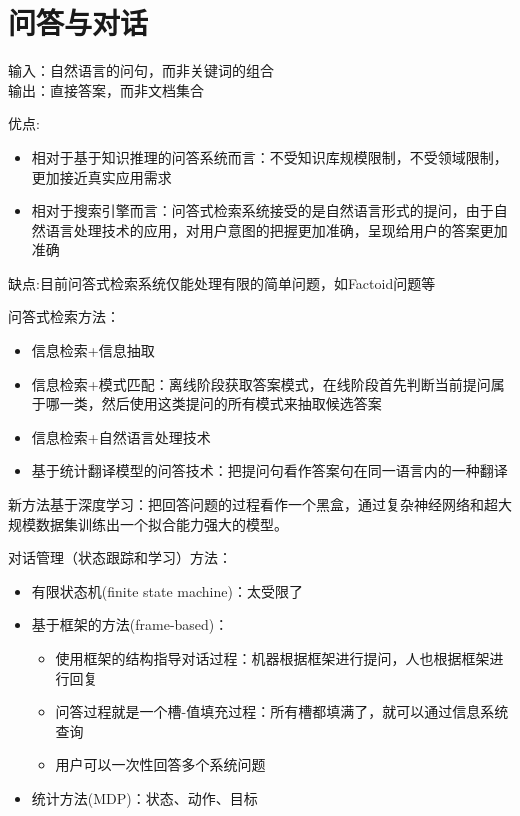 
\section{问答与对话}
\begin{definition}[问答系统]
输入：自然语言的问句，而非关键词的组合\\
输出：直接答案，而非文档集合
\end{definition}

优点:
\begin{itemize}
	\item 相对于基于知识推理的问答系统而言：不受知识库规模限制，不受领域限制，更加接近真实应用需求
	\item 相对于搜索引擎而言：问答式检索系统接受的是自然语言形式的提问，由于自然语言处理技术的应用，对用户意图的把握更加准确，呈现给用户的答案更加准确
\end{itemize}
缺点:目前问答式检索系统仅能处理有限的简单问题，如Factoid问题等

问答式检索方法：
\begin{itemize}
\item 信息检索+信息抽取
\item 信息检索+模式匹配：离线阶段获取答案模式，在线阶段首先判断当前提问属于哪一类，然后使用这类提问的所有模式来抽取候选答案
\item 信息检索+自然语言处理技术
\item 基于统计翻译模型的问答技术：把提问句看作答案句在同一语言内的一种翻译
\end{itemize}

新方法基于深度学习：把回答问题的过程看作一个黑盒，通过复杂神经网络和超大规模数据集训练出一个拟合能力强大的模型。

对话管理（状态跟踪和学习）方法：
\begin{itemize}
	\item 有限状态机(finite state machine)：太受限了
	\item 基于框架的方法(frame-based)：
	\begin{itemize}
		\item 使用框架的结构指导对话过程：机器根据框架进行提问，人也根据框架进行回复
		\item 问答过程就是一个槽-值填充过程：所有槽都填满了，就可以通过信息系统查询
		\item 用户可以一次性回答多个系统问题
	\end{itemize}
	\item 统计方法(MDP)：状态、动作、目标
\end{itemize}